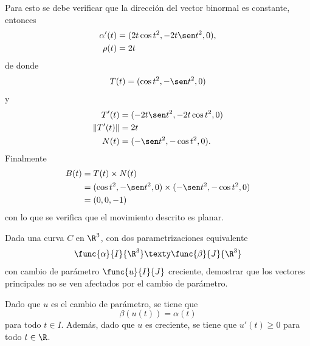 \documentclass[a4,11pt]{aleph-examen}
\begin{document}
\begin{preguntas}
\begin{respuesta}
    Para esto se debe verificar que la dirección del vector binormal es constante, entonces
    \begin{align*}
        \alpha'(t)&=(2t\cos t^2,-2t\sen t^2,0), \\
        \rho(t)&=2t
    \end{align*}
    de donde 
    \[
        T(t)=(\cos t^2,-\sen t^2,0)
    \]
    y
    \begin{align*}
        T'(t)&=(-2t\sen t^2,-2t\cos t^2,0)\\
        \|T'(t)\|&=2t\\
        N(t)&=(-\sen t^2,-\cos t^2,0).
    \end{align*}
    Finalmente
    \begin{align*}
        B(t)&=T(t) \times N(t)\\
        &=(\cos t^2,-\sen t^2,0) \times (-\sen t^2,-\cos t^2,0)\\
        &=(0,0,-1)
    \end{align*}
    con lo que se verifica que el movimiento descrito es planar. 
\end{respuesta}

\item
    Dada una curva $C$ en $\R^3$, con dos parametrizaciones equivalente
    \[
        \func{\alpha}{I}{\R^3}
        \texty
        \func{\beta}{J}{\R^3}
    \]
    con cambio de parámetro $\func{u}{I}{J}$ creciente, demostrar que los vectores principales no se ven afectados por el cambio de parámetro.
    
\begin{respuesta}
    Dado que $u$ es el cambio de parámetro, se tiene que
    \[
        \beta(u(t))=\alpha(t)
    \]
    para todo $t\in I$. Además, dado que $u$ es creciente, se tiene que $u'(t)\geq 0$ para todo $t\in\R$.
    

\end{respuesta}
\end{preguntas}
\end{document}
